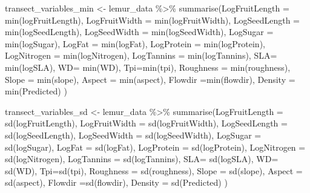 \documentclass[
  12pt,
]{article}
\newenvironment{Shaded}{\begin{snugshade}}{\end{snugshade}}
\newcommand{\AttributeTok}[1]{\textcolor[rgb]{0.77,0.63,0.00}{#1}}
\newcommand{\FunctionTok}[1]{\textcolor[rgb]{0.00,0.00,0.00}{#1}}
\newcommand{\NormalTok}[1]{#1}
\newcommand{\OtherTok}[1]{\textcolor[rgb]{0.56,0.35,0.01}{#1}}
\newcommand{\SpecialCharTok}[1]{\textcolor[rgb]{0.00,0.00,0.00}{#1}}
\begin{document}
\begin{Shaded}
\begin{Highlighting}[]
\NormalTok{transect\_variables\_min }\OtherTok{\textless{}{-}}\NormalTok{ lemur\_data }\SpecialCharTok{\%\textgreater{}\%}
  \FunctionTok{summarise}\NormalTok{(}\AttributeTok{LogFruitLength =} \FunctionTok{min}\NormalTok{(logFruitLength),}
            \AttributeTok{LogFruitWidth =} \FunctionTok{min}\NormalTok{(logFruitWidth),}
            \AttributeTok{LogSeedLength =} \FunctionTok{min}\NormalTok{(logSeedLength),}
            \AttributeTok{LogSeedWidth =} \FunctionTok{min}\NormalTok{(logSeedWidth),}
          \AttributeTok{LogSugar =} \FunctionTok{min}\NormalTok{(logSugar),}
            \AttributeTok{LogFat =} \FunctionTok{min}\NormalTok{(logFat),}
            \AttributeTok{LogProtein =} \FunctionTok{min}\NormalTok{(logProtein),}
            \AttributeTok{LogNitrogen =} \FunctionTok{min}\NormalTok{(logNitrogen),}
            \AttributeTok{LogTannins =} \FunctionTok{min}\NormalTok{(logTannins),}
            \AttributeTok{SLA=} \FunctionTok{min}\NormalTok{(logSLA),}
            \AttributeTok{WD=} \FunctionTok{min}\NormalTok{(WD),}
            \AttributeTok{Tpi=}\FunctionTok{min}\NormalTok{(tpi),}
            \AttributeTok{Roughness =} \FunctionTok{min}\NormalTok{(roughness),}
            \AttributeTok{Slope =} \FunctionTok{min}\NormalTok{(slope),}
            \AttributeTok{Aspect =} \FunctionTok{min}\NormalTok{(aspect),}
            \AttributeTok{Flowdir =}\FunctionTok{min}\NormalTok{(flowdir),}
           \AttributeTok{Density =} \FunctionTok{min}\NormalTok{(Predicted)}
\NormalTok{            )}

\NormalTok{transect\_variables\_sd }\OtherTok{\textless{}{-}}\NormalTok{ lemur\_data }\SpecialCharTok{\%\textgreater{}\%}
  \FunctionTok{summarise}\NormalTok{(}\AttributeTok{LogFruitLength =} \FunctionTok{sd}\NormalTok{(logFruitLength),}
          \AttributeTok{LogFruitWidth =} \FunctionTok{sd}\NormalTok{(logFruitWidth),}
          \AttributeTok{LogSeedLength =} \FunctionTok{sd}\NormalTok{(logSeedLength),}
            \AttributeTok{LogSeedWidth =} \FunctionTok{sd}\NormalTok{(logSeedWidth),}
          \AttributeTok{LogSugar =} \FunctionTok{sd}\NormalTok{(logSugar),}
            \AttributeTok{LogFat =} \FunctionTok{sd}\NormalTok{(logFat),}
            \AttributeTok{LogProtein =} \FunctionTok{sd}\NormalTok{(logProtein),}
            \AttributeTok{LogNitrogen =} \FunctionTok{sd}\NormalTok{(logNitrogen),}
            \AttributeTok{LogTannins =} \FunctionTok{sd}\NormalTok{(logTannins),}
            \AttributeTok{SLA=} \FunctionTok{sd}\NormalTok{(logSLA),}
            \AttributeTok{WD=} \FunctionTok{sd}\NormalTok{(WD),}
            \AttributeTok{Tpi=}\FunctionTok{sd}\NormalTok{(tpi),}
            \AttributeTok{Roughness =} \FunctionTok{sd}\NormalTok{(roughness),}
            \AttributeTok{Slope =} \FunctionTok{sd}\NormalTok{(slope),}
            \AttributeTok{Aspect =} \FunctionTok{sd}\NormalTok{(aspect),}
            \AttributeTok{Flowdir =}\FunctionTok{sd}\NormalTok{(flowdir),}
           \AttributeTok{Density =} \FunctionTok{sd}\NormalTok{(Predicted)}
\NormalTok{            )}


\end{Highlighting}
\end{Shaded}
\end{document}
